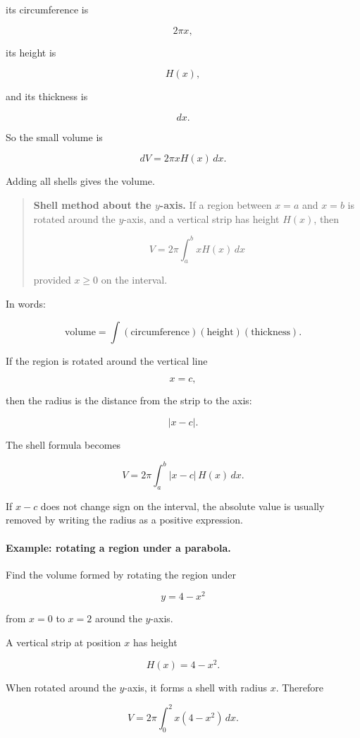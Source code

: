 its circumference is

\[
2\pi x,
\]

its height is

\[
H(x),
\]

and its thickness is

\[
dx.
\]

So the small volume is

\[
dV=2\pi xH(x)\,dx.
\]

Adding all shells gives the volume.

\begin{quote}
\textbf{Shell method about the \(y\)-axis.}
If a region between \(x=a\) and \(x=b\) is rotated around the \(y\)-axis, and a vertical
strip has height \(H(x)\), then

\[
\boxed{
V=2\pi\int_a^b xH(x)\,dx
}
\]

provided \(x\ge0\) on the interval.
\end{quote}

In words:

\[
\boxed{
\text{volume}=\int(\text{circumference})(\text{height})(\text{thickness}).
}
\]

If the region is rotated around the vertical line

\[
x=c,
\]

then the radius is the distance from the strip to the axis:

\[
|x-c|.
\]

The shell formula becomes

\[
\boxed{
V=2\pi\int_a^b |x-c|\,H(x)\,dx.
}
\]

If \(x-c\) does not change sign on the interval, the absolute value is usually removed
by writing the radius as a positive expression.

\paragraph{Example: rotating a region under a parabola.}
Find the volume formed by rotating the region under

\[
y=4-x^2
\]

from \(x=0\) to \(x=2\) around the \(y\)-axis.

A vertical strip at position \(x\) has height

\[
H(x)=4-x^2.
\]

When rotated around the \(y\)-axis, it forms a shell with radius \(x\).  Therefore

\[
V=2\pi\int_0^2 x(4-x^2)\,dx.
\]

